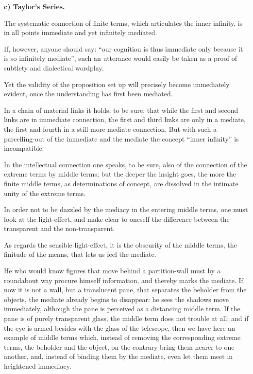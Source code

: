 \documentclass[12pt]{book}
\begin{document}
\begin{center}
\textbf{c) Taylor's Series.}
\end{center}
{}

The systematic connection of finite terms, which articulates the inner infinity, is
in all points immediate and yet infinitely mediated.

If, however, anyone should say: ``our cognition is thus immediate only because it is
so infinitely mediate'', such an utterance would easily be taken as a proof of
subtlety and dialectical wordplay.

Yet the validity of the proposition set up will precisely become immediately evident,
once the understanding has first been mediated.

In a chain of material links it holds, to be sure, that while the first and second
links are in immediate connection, the first and third links are only in a mediate,
the first and fourth in a still more mediate connection. But with such a
parcelling-out of the immediate and the mediate the concept ``inner infinity'' is
incompatible.

In the intellectual connection one speaks, to be sure, also of the connection of the
extreme terms by middle terms; but the deeper the insight goes, the more the finite
middle terms, as determinations of concept, are dissolved in the intimate unity of
the extreme terms.

In order not to be dazzled by the mediacy in the entering middle terms, one must look
at the light-effect, and make clear to oneself the difference between the transparent
and the non-transparent.

As regards the sensible light-effect, it is the obscurity of the middle terms, the
finitude of the means, that lets us feel the mediate.

He who would know figures that move behind a partition-wall must by a roundabout way
procure himself information, and thereby marks the mediate. If now it is not a wall,
but a translucent pane, that separates the beholder from the objects, the mediate
already begins to disappear: he sees the shadows move immediately, although the pane
is perceived as a distancing middle term. If the pane is of purely transparent glass,
the middle term does not trouble at all; and if the eye is armed besides with the
glass of the telescope, then we have here an example of middle terms which, instead
of removing the corresponding extreme terms, the beholder and the object, on the
contrary bring them nearer to one another, and, instead of binding them by the
mediate, even let them meet in heightened immediacy.
\end{document}

